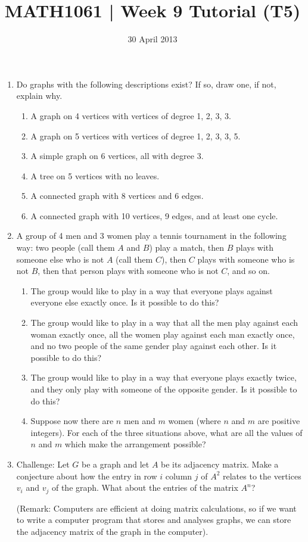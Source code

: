 \documentclass[a4paper,12pt]{article}
\begin{document}
\pagestyle{myheadings}

\title{MATH1061 | Week 9 Tutorial (T5)}
\date{30 April 2013}
\maketitle

\begin{enumerate}
\item
Do graphs with the following descriptions exist? If so, draw one, if not,
explain why.
    \begin{enumerate}
    \item A graph on 4 vertices with vertices of degree 1, 2, 3, 3.
    \item A graph on 5 vertices with vertices of degree 1, 2, 3, 3, 5.
    \item A simple graph on 6 vertices, all with degree 3.
    \item A tree on 5 vertices with no leaves.
    \item A connected graph with 8 vertices and 6 edges.
    \item A connected graph with 10 vertices, 9 edges, and at least one cycle.
    \end{enumerate}
\item
A group of 4 men and 3 women play a tennis tournament in the following way: two
people (call them $A$ and $B$) play a match, then $B$ plays with someone
else who is not $A$ (call them $C$), then $C$ plays with someone who is
not $B$, then that person plays with someone who is not $C$, and so on.
    \begin{enumerate}
    \item The group would like to play in a way that everyone plays against
       everyone else exactly once. Is it possible to do this?
    \item The group would like to play in a way that all the men play against each
       woman exactly once, all the women play against each man exactly once,
       and no two people of the same gender play against each other. Is it
       possible to do this?
    \item The group would like to play in a way that everyone plays exactly twice,
       and they only play with someone of the opposite gender. Is it possible to
       do this?
    \item Suppose now there are $n$ men and $m$ women (where $n$ and
    $m$ are positive integers). For each of the three situations above, what are
    all the values of $n$ and $m$ which make the arrangement possible?
    \end{enumerate}
\item
Challenge: Let $G$ be a graph and let $A$ be its adjacency matrix.
Make a conjecture about how the entry in row $i$ column $j$ of $A^2$
relates to the vertices $v_i$ and $v_j$ of the graph. What about the entries of
the matrix $A^n$?

(Remark: Computers are efficient at doing matrix calculations, so if we want
to write a computer program that stores and analyses graphs, we can store the
adjacency matrix of the graph in the computer).
\end{enumerate}
\end{document}
